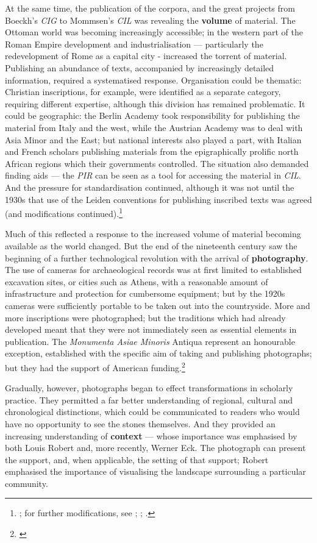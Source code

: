 \documentclass[amsthm,ebook]{saparticle}
\begin{document}
At the same time, the publication of the corpora, and the great projects from Boeckh's \emph{CIG} to Mommsen's \emph{CIL} was
revealing the \textbf{volume} of material. The Ottoman world was becoming increasingly accessible; in the western part of the
Roman Empire development and industrialisation --- particularly the redevelopment of Rome as a capital city - increased
the torrent of material. Publishing an abundance of texts, accompanied by increasingly detailed information, required a
systematised response. Organisation could be thematic: Christian inscriptions, for example, were identified as a
separate category, requiring different expertise, although this division has remained problematic. It could be
geographic: the Berlin Academy took responsibility for publishing the material from Italy and the west, while the
Austrian Academy was to deal with Asia Minor and the East; but national interests also played a part, with Italian and
French scholars publishing materials from the epigraphically prolific north African regions which their governments
controlled. The situation also demanded finding aids --- the \emph{PIR} can be seen as a tool for accessing the material in \emph{CIL}.
And the pressure for standardisation continued, although it was not until the 1930s that use of the Leiden conventions
for publishing inscribed texts was agreed (and modifications continued).\footnote{\citet[262–9.7]{van1932projet} ; for further modifications, see
\citet{dow1969conventions}; \citet{krummrey_criteri_1980}; \citet{Panciera1991}.}


Much of this reflected a response to the increased volume of material becoming available as the world changed. But the
end of the nineteenth century saw the beginning of a further technological revolution with the arrival of \textbf{photography}.
The use of cameras for archaeological records was at first limited to established excavation sites, or cities such as
Athens, with a reasonable amount of infrastructure and protection for cumbersome equipment; but by the 1920s cameras
were sufficiently portable to be taken out into the countryside. More and more inscriptions were photographed; but the
traditions which had already developed meant that they were not immediately seen as essential elements in publication.
The \emph{Monumenta Asiae Minoris} Antiqua represent an honourable exception, established with the specific aim of taking and
publishing photographs; but they had the support of American funding.\footnote{\citet{rouechethon2013}} 


Gradually, however, photographs began to effect transformations in scholarly practice. They permitted a far better
understanding of regional, cultural and chronological distinctions, which could be communicated to readers who would
have no opportunity to see the stones themselves. And they provided an increasing understanding of \textbf{context} --- whose
importance was emphasised by both Louis Robert and, more recently, Werner Eck. The photograph can present the support,
and, when applicable, the setting of that support; Robert emphasised the importance of visualising the landscape
surrounding a particular community.
\end{document}
